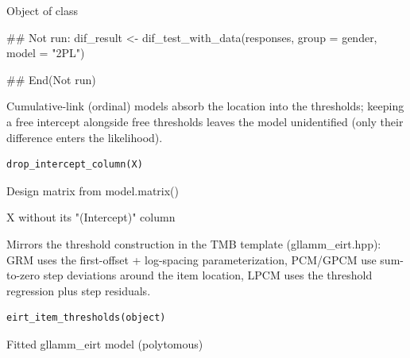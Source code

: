\documentclass[a4paper]{book}
\begin{document}
%
\begin{Value}
Object of class 
\end{Value}
%
\begin{Examples}
\begin{ExampleCode}
## Not run: 
dif_result <- dif_test_with_data(responses, group = gender, model = "2PL")

## End(Not run)

\end{ExampleCode}
\end{Examples}
%
\begin{Description}
Cumulative-link (ordinal) models absorb the location into the thresholds;
keeping a free intercept alongside free thresholds leaves the model
unidentified (only their difference enters the likelihood).
\end{Description}
%
\begin{Usage}
\begin{verbatim}
drop_intercept_column(X)
\end{verbatim}
\end{Usage}
%
\begin{Arguments}
\begin{ldescription}
\item[\code{X}] Design matrix from model.matrix()
\end{ldescription}
\end{Arguments}
%
\begin{Value}
X without its "(Intercept)" column
\end{Value}
%
\begin{Description}
Mirrors the threshold construction in the TMB template (gllamm\_eirt.hpp):
GRM uses the first-offset + log-spacing parameterization, PCM/GPCM use
sum-to-zero step deviations around the item location, LPCM uses the
threshold regression plus step residuals.
\end{Description}
%
\begin{Usage}
\begin{verbatim}
eirt_item_thresholds(object)
\end{verbatim}
\end{Usage}
%
\begin{Arguments}
\begin{ldescription}
\item[\code{object}] Fitted gllamm\_eirt model (polytomous)
\end{ldescription}
\end{Arguments}
\end{document}

